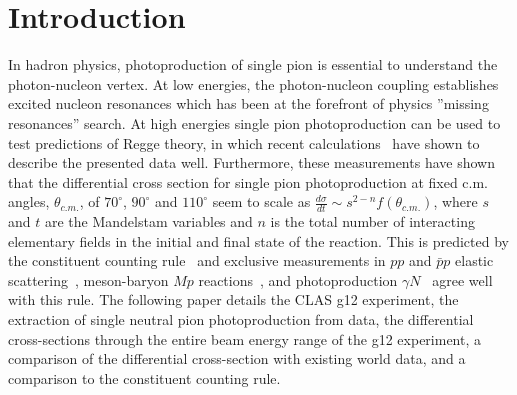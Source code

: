 \section{\label{sec:level1}Introduction}
In hadron physics, photoproduction of single pion is essential to understand the photon-nucleon vertex. At low energies, the photon-nucleon coupling establishes excited nucleon resonances which has been at the forefront of physics ''missing resonances'' search. At high energies single pion photoproduction can be used to test predictions of Regge theory, in which recent calculations~\cite{JPAC} have shown to describe the presented data well. Furthermore, these measurements have shown that the differential cross section for single pion photoproduction at fixed c.m. angles, $\theta_{c.m.}$, of $70^{\circ}$, $90^{\circ}$ and $110^{\circ}$ seem to scale as $\frac{d\sigma}{dt} \sim s^{2-n}f(\theta_{c.m.})$, where $s$ and $t$ are the Mandelstam variables and $n$ is the total number of interacting elementary fields in the initial and final state of the reaction. This is predicted by the constituent counting rule~\cite{scaling1,scaling2} and exclusive measurements in $pp$ and  $\bar{p}p$ elastic scattering~\cite{scalingexp5, scalingexp7}, meson-baryon $M p$ reactions~\cite{scalingexp7}, and photoproduction $\gamma N$~\cite{scalingexp2, scalingexp3, scalingexp4, scalingexp6, scalingexp8, scalingexp9, scalingexp10, scalingexp11} agree well with this rule. The following paper details the CLAS g12 experiment, the extraction of single neutral pion photoproduction from data, the differential cross-sections through the entire beam energy range of the g12 experiment, a comparison of the differential cross-section with existing world data, and a comparison to the constituent counting rule. 


